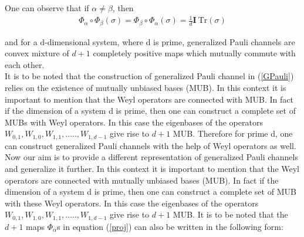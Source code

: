 \documentclass[12pt]{amsart}
\numberwithin{equation}{section}
\newtheorem{proposition}{Proposition}[section]
\begin{document}
One can observe that if $\alpha \neq \beta$, then
\begin{eqnarray*}
   \Phi_{\alpha} \circ \Phi_{\beta} (\sigma) = \Phi_{\beta} \circ \Phi_{\alpha} (\sigma) = \frac{1}{d} \mathbf{I}~ \text{Tr} (\sigma)
\end{eqnarray*}

 and for a d-dimensional system, where d is prime, generalized Pauli channels are convex mixture of $d+1$ completely positive maps which mutually commute with each other.\\

It is to be noted that the construction of generalized Pauli channel in (\ref{GPauli}) relies on the existence of mutually unbiased bases (MUB). In this context it is important to mention that the Weyl operators are connected with MUB. In fact if the dimension of a system d is prime, then one can construct a complete set of MUBs with Weyl operators. In this case the eigenbases of the operators $W_{0,1},W_{1,0},W_{1,1},.....,W_{1,d-1} $ give rise to $d+1$ MUB. Therefore for prime d, one can construct generalized Pauli channels with the help of Weyl operators as well. Now our aim is to provide a different representation of generalized Pauli channels and generalize it further.
\iffalse
In this context it is important to mention that the Weyl operators are connected with mutually unbiased bases (MUB). In fact if the dimension of a system d is prime, then one can construct a complete set of MUB with these Weyl operators. In this case the eigenbases of the operators $W_{0,1},W_{1,0},W_{1,1},.....,W_{1,d-1} $ give rise to $d+1$ MUB. It is to be noted that the $d+1$ maps $\Phi_\alpha$s in equation (\ref{proj}) can also be written in the following form:\\
\end{document}
